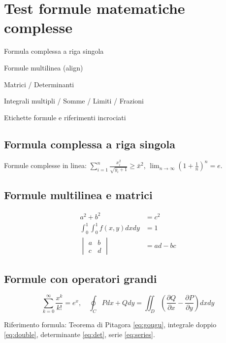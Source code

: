 \documentclass[it]{../../elegantbook}
\begin{document}
\chapter{Test formule matematiche complesse}
\begin{introduction}
\item Formula complessa a riga singola
\item Formule multilinea (align)
\item Matrici / Determinanti
\item Integrali multipli / Somme / Limiti / Frazioni
\item Etichette formule e riferimenti incrociati
\end{introduction}

\section{Formula complessa a riga singola}
Formule complesse in linea: $\sum_{i=1}^n \frac{x_i^2}{\sqrt{y_i+1}} \geq \bar{x}^2$, $\lim_{n\to\infty} \left(1+\frac{1}{n}\right)^n = e$.

\section{Formule multilinea e matrici}
\begin{align}
a^2 + b^2 &= c^2 \label{eq:gougu} \\
\int_{0}^{1}\int_{0}^{1} f(x,y) dxdy &= 1 \label{eq:double} \\
\begin{vmatrix}
a & b \\
c & d
\end{vmatrix} &= ad-bc \label{eq:det}
\end{align}

\section{Formule con operatori grandi}
\begin{equation}\label{eq:series}
\sum_{k=0}^{\infty} \frac{x^k}{k!} = e^x,\quad \oint_{C} Pdx+Qdy = \iint_{D}\left(\frac{\partial Q}{\partial x}-\frac{\partial P}{\partial y}\right)dxdy
\end{equation}

Riferimento formula: Teorema di Pitagora \eqref{eq:gougu}, integrale doppio \eqref{eq:double}, determinante \eqref{eq:det}, serie \eqref{eq:series}.
\end{document}
